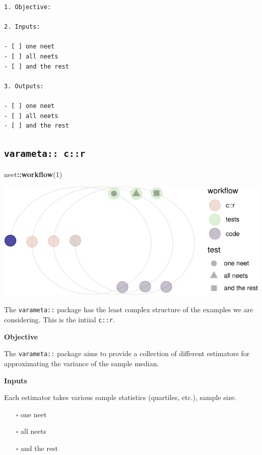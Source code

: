 \documentclass[
]{article}
\newenvironment{Shaded}{\begin{snugshade}}{\end{snugshade}}
\newcommand{\DecValTok}[1]{\textcolor[rgb]{0.00,0.00,0.81}{#1}}
\newcommand{\KeywordTok}[1]{\textcolor[rgb]{0.13,0.29,0.53}{\textbf{#1}}}
\newcommand{\NormalTok}[1]{#1}
\newcommand{\OperatorTok}[1]{\textcolor[rgb]{0.81,0.36,0.00}{\textbf{#1}}}
\providecommand{\tightlist}{%
  \setlength{\itemsep}{0pt}\setlength{\parskip}{0pt}}
\begin{document}
\begin{verbatim}
1. Objective:

2. Inputs:

- [ ] one neet
- [ ] all neets
- [ ] and the rest

3. Outputs:

- [ ] one neet
- [ ] all neets
- [ ] and the rest
\end{verbatim}

\hypertarget{varameta-cr}{%
\subsection{\texorpdfstring{\texttt{varameta::\ c::r}}{varameta:: c::r}}\label{varameta-cr}}

\begin{Shaded}
\begin{Highlighting}[]
\NormalTok{neet}\OperatorTok{::}\KeywordTok{workflow}\NormalTok{(}\DecValTok{1}\NormalTok{)}
\end{Highlighting}
\end{Shaded}

\begin{center}\includegraphics{when-is-done-done_files/figure-latex/unnamed-chunk-8-1} \end{center}

The \texttt{varameta::} package has the least complex structure of the examples we are considering. This is the intiial \texttt{c::r}.

\textbf{Objective}

The \texttt{varameta::} package aims to provide a collection of different estimators for approximating the variance of the sample median.

\textbf{Inputs}

Each estimator takes various sample statistics (quartiles, etc.), sample size.

\begin{itemize}
\tightlist
\item[$\square$]
  one neet
\item[$\square$]
  all neets
\item[$\square$]
  and the rest
\end{itemize}
\end{document}
